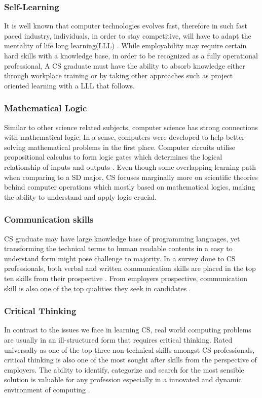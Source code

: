 \documentclass[a4paper, 11pt]{report}
\begin{document}
\subsubsection{Self-Learning}
It is well known that computer technologies evolves fast, therefore in such fast paced industry, individuals, in order to stay competitive, will have to adapt the mentality of life long learning(LLL) \cite{borjesson2007continuing}. While employability may require certain hard skills with a knowledge base, in order to be recognized as a fully operational professional, A CS graduate must have the ability to absorb knowledge either through workplace training or by taking other approaches such as project oriented learning with a LLL that follows.
\subsubsection{Mathematical Logic}
Similar to other science related subjects, computer science has strong connections with mathematical logic. In a sense, computers were developed to help better solving mathematical problems in the first place. Computer circuits utilise propositional calculus to form logic gates which determines the logical relationship of inputs and outputs \cite{ben2012mathematical}. Even though some overlapping learning path when comparing to a SD major, CS focuses marginally more on scientific theories behind computer operations which mostly based on mathematical logics, making the ability to understand and apply logic crucial.
\subsubsection{Communication skills}
CS graduate may have large knowledge base of programming languages, yet transforming the technical terms to human readable contents in a easy to understand form might pose challenge to majority. In a survey done to CS professionals, both verbal and written communication skills are placed in the top ten skills from their prospective \cite{exter2018comparing}. From employers prospective, communication skill is also one of the top qualities they seek in candidates \cite{lundberg2021employable}.
\subsubsection{Critical Thinking}
In contrast to the issues we face in learning CS, real world computing problems are usually in an ill-structured form that requires critical thinking. Rated universally as one of the top three non-technical skills amongst CS professionals, critical thinking is also one of the most sought after skills from the perspective of employers. The ability to identify, categorize and search for the most sensible solution is valuable for any profession especially in a innovated and dynamic environment of computing \cite{baird2019employers}. 
\end{document}
